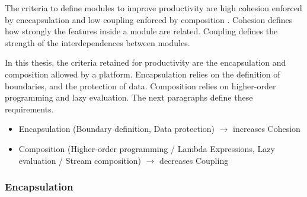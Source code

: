 

The criteria to define modules to improve productivity are high cohesion enforced by enccapsulation and low coupling enforced by composition \cite{Stevens1974}.
Cohesion defines how strongly the features inside a module are related.
Coupling defines the strength of the interdependences between modules.

In this thesis, the criteria retained for productivity are the encapsulation and composition allowed by a platform.
Encapsulation relies on the definition of boundaries, and the protection of data.
Composition relies on higher-order programming and lazy evaluation.
The next paragraphs define these requirements.


\begin{itemize}
\item Encapsulation (Boundary definition, Data protection)
  \subitem $\to$ increases Cohesion
\item Composition (Higher-order programming / Lambda Expressions, Lazy evaluation / Stream composition)
  \subitem $\to$ decreases Coupling
\end{itemize}

\subsubsection{Encapsulation} \label{chapter3:definitions:productivity:encapsulation}

